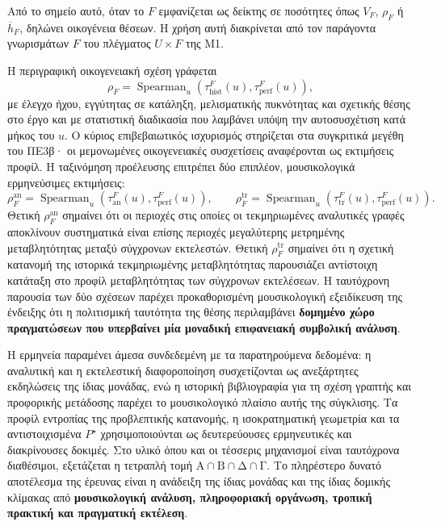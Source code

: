 \documentclass[11pt,a4paper]{article}
\begin{document}
Από το σημείο αυτό, όταν το $F$ εμφανίζεται ως δείκτης σε ποσότητες όπως $V_F$, $\rho_F$ ή $\overline h_F$, δηλώνει οικογένεια θέσεων. Η χρήση αυτή διακρίνεται από τον παράγοντα γνωρισμάτων $F$ του πλέγματος $U\times F$ της M1.

Η περιγραφική οικογενειακή σχέση γράφεται
\[
\rho_F=\operatorname{Spearman}_{u}\!\left(\tau_{\mathrm{hist}}^{F}(u),\tau_{\mathrm{perf}}^{F}(u)\right),
\]
με έλεγχο ήχου, εγγύτητας σε κατάληξη, μελισματικής πυκνότητας και σχετικής θέσης στο έργο και με στατιστική διαδικασία που λαμβάνει υπόψη την αυτοσυσχέτιση κατά μήκος του $u$. Ο κύριος επιβεβαιωτικός ισχυρισμός στηρίζεται στα συγκριτικά μεγέθη του ΠΕ3β· οι μεμονωμένες οικογενειακές συσχετίσεις αναφέρονται ως εκτιμήσεις προφίλ. Η ταξινόμηση προέλευσης επιτρέπει δύο επιπλέον, μουσικολογικά ερμηνεύσιμες εκτιμήσεις:
\[
\rho_F^{\mathrm{an}}=\operatorname{Spearman}_{u}\!\left(\tau_{\mathrm{an}}^{F}(u),\tau_{\mathrm{perf}}^{F}(u)\right),
\qquad
\rho_F^{\mathrm{tr}}=\operatorname{Spearman}_{u}\!\left(\tau_{\mathrm{tr}}^{F}(u),\tau_{\mathrm{perf}}^{F}(u)\right).
\]
Θετική $\rho_F^{\mathrm{an}}$ σημαίνει ότι οι περιοχές στις οποίες οι τεκμηριωμένες αναλυτικές γραφές αποκλίνουν συστηματικά είναι επίσης περιοχές μεγαλύτερης μετρημένης μεταβλητότητας μεταξύ σύγχρονων εκτελεστών. Θετική $\rho_F^{\mathrm{tr}}$ σημαίνει ότι η σχετική κατανομή της ιστορικά τεκμηριωμένης μεταβλητότητας παρουσιάζει αντίστοιχη κατάταξη στο προφίλ μεταβλητότητας των σύγχρονων εκτελέσεων. Η ταυτόχρονη παρουσία των δύο σχέσεων παρέχει προκαθορισμένη μουσικολογική εξειδίκευση της ένδειξης ότι η πολιτισμική ταυτότητα της θέσης περιλαμβάνει \textbf{δομημένο χώρο πραγματώσεων που υπερβαίνει μία μοναδική επιφανειακή συμβολική ανάλυση}.

Η ερμηνεία παραμένει άμεσα συνδεδεμένη με τα παρατηρούμενα δεδομένα: η αναλυτική και η εκτελεστική διαφοροποίηση συσχετίζονται ως ανεξάρτητες εκδηλώσεις της ίδιας μονάδας, ενώ η ιστορική βιβλιογραφία για τη σχέση γραπτής και προφορικής μετάδοσης παρέχει το μουσικολογικό πλαίσιο αυτής της σύγκλισης. Τα προφίλ εντροπίας της προβλεπτικής κατανομής, η ισοκρατηματική γεωμετρία και τα αντιστοιχισμένα $P^{\star}$ χρησιμοποιούνται ως δευτερεύουσες ερμηνευτικές και διακρίνουσες δοκιμές.
Στο υλικό όπου και οι τέσσερις μηχανισμοί είναι ταυτόχρονα διαθέσιμοι, εξετάζεται η τετραπλή τομή \(\text{Α}\cap\text{Β}\cap\text{Δ}\cap\text{Γ}\). Το πληρέστερο δυνατό αποτέλεσμα της έρευνας είναι η ανάδειξη της ίδιας μονάδας και της ίδιας δομικής κλίμακας από \textbf{μουσικολογική ανάλυση, πληροφοριακή οργάνωση, τροπική πρακτική και πραγματική εκτέλεση}.
\end{document}
